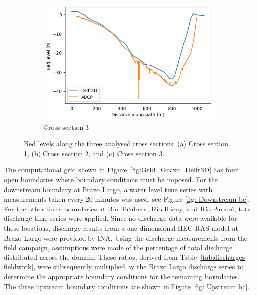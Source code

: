 \begin{figure}[H]
    \vspace{1em}
    \begin{subfigure}[t]{0.48\linewidth}
        \centering
        \includegraphics[width=\linewidth,height=0.6\linewidth,keepaspectratio]{figures/ch7/Bathymetry_cs3.png}
        \caption{Cross section 3}
        \label{fig:bathy_cs3}
    \end{subfigure}

    \caption{Bed levels along the three analysed cross sections: (a) Cross section 1, (b) Cross section 2, and (c) Cross section 3.}
    \label{fig:bathymetry_cross_sections}
\end{figure}

The computational grid shown in Figure~\ref{fig:Grid_Guazu_Delft3D} has four open boundaries where boundary conditions must be imposed. For the downstream boundary at Brazo Largo, a water level time series with measurements taken every 20 minutes was used, see Figure \ref{fig: Downstream bc}. For the other three boundaries at Río Talabera, Río Ibicuy, and Río Paraná, total discharge time series were applied. Since no discharge data were available for these locations, discharge results from a one-dimensional HEC-RAS model at Brazo Largo were provided by INA. Using the discharge measurements from the field campaign, assumptions were made of the percentage of total discharge distributed across the domain. These ratios, derived from Table~\ref{tab:discharges fieldwork}, were subsequently multiplied by the Brazo Largo discharge series to determine the appropriate boundary conditions for the remaining boundaries. The three upstream boundary conditions are shown in Figure \ref{fig: Upstream bc}.

